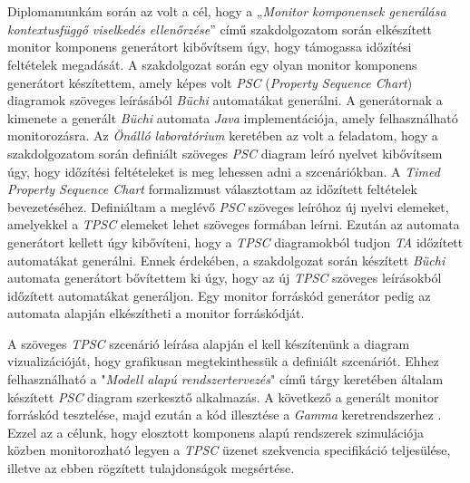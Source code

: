 \chapter{\bevezetes}
Diplomamunkám során az volt a cél, hogy a „\textit{Monitor komponensek generálása kontextusfüggő viselkedés ellenőrzése}” \cite{Bakai} című szakdolgozatom során elkészített monitor komponens generátort kibővítsem úgy, hogy támogassa időzítési feltételek megadását.
A szakdolgozat során egy olyan monitor komponens generátort készítettem, amely képes volt \textit{PSC} (\textit{Property Sequence Chart}) \cite{PSC1} diagramok szöveges leírásából \textit{Büchi} \cite{PSC1} automatákat generálni.
A generátornak a kimenete a generált \textit{Büchi} automata \textit{Java} implementációja, amely felhasználható monitorozásra.
Az \textit{Önálló laboratórium} keretében az volt a feladatom, hogy a szakdolgozatom során definiált szöveges \textit{PSC} diagram leíró nyelvet kibővítsem úgy, hogy időzítési feltételeket is meg lehessen adni a szcenáriókban.
A \textit{Timed Property Sequence Chart} \cite{TPSC1} formalizmust választottam az időzített feltételek bevezetéséhez.
Definiáltam a meglévő \textit{PSC} szöveges leíróhoz új nyelvi elemeket, amelyekkel a \textit{TPSC} elemeket lehet szöveges formában leírni.
Ezután az automata generátort kellett úgy kibővíteni, hogy a \textit{TPSC} diagramokból tudjon \textit{TA} időzített automatákat \cite{TPSC1} generálni.
Ennek érdekében, a szakdolgozat során készített \textit{Büchi} automata generátort bővítettem ki úgy, hogy az új \textit{TPSC} szöveges leírásokból időzített automatákat generáljon.
Egy monitor forráskód generátor pedig az automata alapján elkészítheti a monitor forráskódját.

A szöveges \textit{TPSC} szcenárió leírása alapján el kell készítenünk a diagram vizualizációját, hogy grafikusan megtekinthessük a definiált szcenáriót.
Ehhez felhasználható a "\textit{Modell alapú rendszertervezés}" című tárgy keretében általam készített \textit{PSC} diagram szerkesztő alkalmazás.
A következő a generált monitor forráskód tesztelése, majd ezután a kód illesztése a \textit{Gamma} keretrendszerhez \cite{Gamma}.
Ezzel az a célunk, hogy elosztott komponens alapú rendszerek szimulációja közben monitorozható legyen a \textit{TPSC} üzenet szekvencia specifikáció teljesülése, illetve az ebben rögzített tulajdonságok megsértése.

